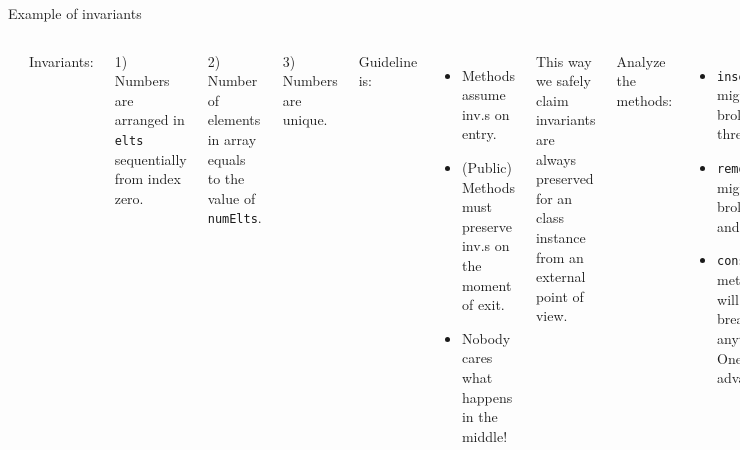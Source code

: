 \begin{frame}{Example of invariants}
\begin{columns}
	
	\vspace{-.3in}
	\inputminted[fontsize=\small]{c++}{code/rc8intset/intset.h}
	
	Invariants:
	
	1) Numbers are arranged in \texttt{elts} sequentially from index zero.

	2) Number of elements in array equals to the value of \texttt{numElts}.
	
	3) Numbers are unique.
	
	\vspace{-.25in}
	Guideline is:
	\begin{itemize}
		\item Methods  assume inv.s on entry.
		\item (Public) Methods must preserve inv.s on the moment of exit.
		\item Nobody cares what happens in the middle!
	\end{itemize}
	This way we safely claim invariants are always preserved for an class instance from an external point of view. 
	
	Analyze the methods:
	\begin{itemize}
		\item \texttt{insert} might broke all three.
		\item \texttt{remove} might broke 1) and 2).
		\item \texttt{const} methods will not break anything! One more advantage!
	\end{itemize}
\end{columns}
\end{frame}

